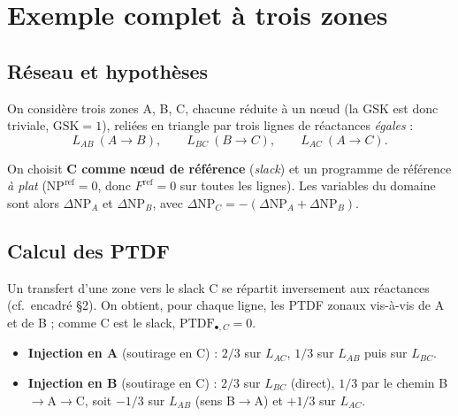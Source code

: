 \documentclass[11pt,a4paper]{article}
\newcommand{\NP}{\mathrm{NP}}
\newcommand{\PTDF}{\mathrm{PTDF}}
\newcommand{\Fref}{F^{\mathrm{ref}}}
\newcommand{\GSK}{\mathrm{GSK}}
\begin{document}
\section{Exemple complet à trois zones}

\subsection{Réseau et hypothèses}

On considère trois zones A, B, C, chacune réduite à un n\oe{}ud (la GSK est
donc triviale, $\GSK=1$), reliées en triangle par trois lignes de
réactances \emph{égales} :
\[
  L_{AB}\ (A\!\to\!B),\qquad L_{BC}\ (B\!\to\!C),\qquad L_{AC}\ (A\!\to\!C).
\]

\begin{center}
\end{center}

On choisit \textbf{C comme n\oe{}ud de référence} (\emph{slack}) et un
programme de référence \emph{à plat} ($\NP^{\mathrm{ref}}=0$, donc
$\Fref=0$ sur toutes les lignes). Les variables du domaine sont alors
$\Delta\NP_A$ et $\Delta\NP_B$, avec
$\Delta\NP_C = -(\Delta\NP_A + \Delta\NP_B)$.

\subsection{Calcul des PTDF}

Un transfert d'une zone vers le slack C se répartit inversement aux
réactances (cf.\ encadré \S2). On obtient, pour chaque ligne, les PTDF
zonaux vis-à-vis de A et de B ; comme C est le slack, $\PTDF_{\bullet,C}=0$.

\begin{itemize}[nosep,leftmargin=1.4em]
  \item \textbf{Injection en A} (soutirage en C) : $2/3$ sur $L_{AC}$,
        $1/3$ sur $L_{AB}$ puis sur $L_{BC}$.
  \item \textbf{Injection en B} (soutirage en C) : $2/3$ sur $L_{BC}$
        (direct), $1/3$ par le chemin B$\to$A$\to$C, soit $-1/3$ sur
        $L_{AB}$ (sens B$\to$A) et $+1/3$ sur $L_{AC}$.
\end{itemize}
\end{document}
